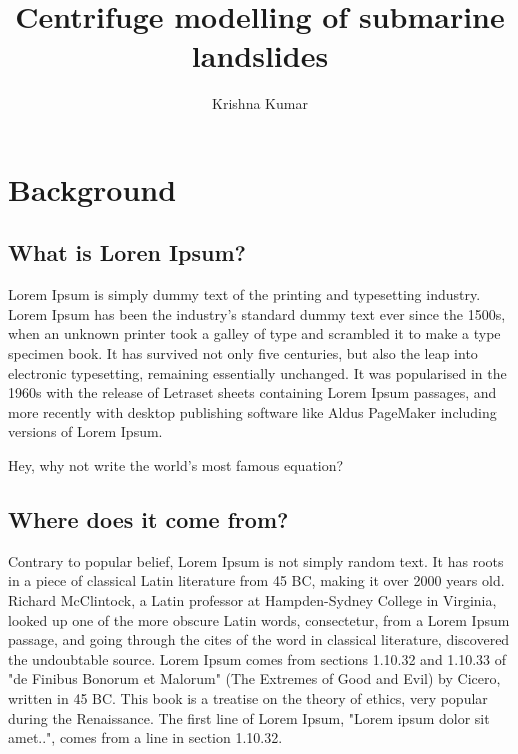 \documentclass[11pt,times]{article}
\title{Centrifuge modelling of submarine landslides} %
\author{Krishna Kumar} %
\begin{document}
\maketitle

\section{Background} %
\subsection{What is Loren Ipsum?} %

Lorem Ipsum is simply dummy text of the printing and typesetting industry. 
Lorem Ipsum has been the industry's standard dummy text ever since the 1500s, 
when an unknown printer took a galley of type and scrambled it to make a type 
specimen book. It has survived not only five centuries, but also the leap into 
electronic typesetting, remaining essentially unchanged. It was popularised in 
the 1960s with the release of Letraset sheets containing Lorem Ipsum passages, 
and more recently with desktop publishing software like Aldus PageMaker 
including versions of Lorem Ipsum.

Hey, why not write the world's most famous equation?


\subsection{Where does it come from?}  %

Contrary to popular belief, Lorem Ipsum is not simply random text. It has roots 
in a piece of classical Latin literature from 45 BC, making it over 2000 years 
old. Richard McClintock, a Latin professor at Hampden-Sydney College in 
Virginia, looked up one of the more obscure Latin words, consectetur, from a 
Lorem Ipsum passage, and going through the cites of the word in classical 
literature, discovered the undoubtable source. Lorem Ipsum comes from sections 
1.10.32 and 1.10.33 of "de Finibus Bonorum et Malorum" (The Extremes of Good 
and Evil) by Cicero, written in 45 BC. This book is a treatise on the theory of 
ethics, very popular during the Renaissance. The first line of Lorem Ipsum, 
"Lorem ipsum dolor sit amet..", comes from a line in section 1.10.32.
\end{document}
